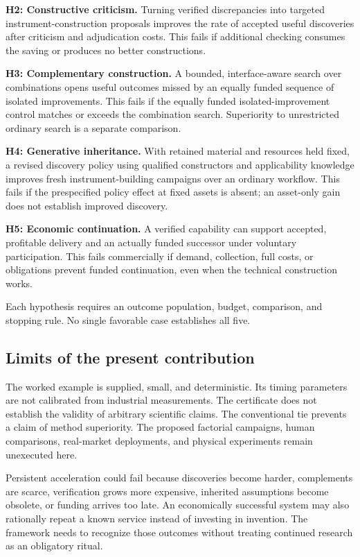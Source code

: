 \documentclass[11pt,letterpaper]{article}
\theoremstyle{remark}\newtheorem{remark}{Remark}[section]
\begin{document}
\textbf{H2: Constructive criticism.}
Turning verified discrepancies into targeted instrument-construction proposals improves the rate of accepted useful discoveries after criticism and adjudication costs.
This fails if additional checking consumes the saving or produces no better constructions.

\textbf{H3: Complementary construction.}
A bounded, interface-aware search over combinations opens useful outcomes missed by an equally funded sequence of isolated improvements.
This fails if the equally funded isolated-improvement control matches or exceeds the combination search.
Superiority to unrestricted ordinary search is a separate comparison.

\textbf{H4: Generative inheritance.}
With retained material and resources held fixed, a revised discovery policy using qualified constructors and applicability knowledge improves fresh instrument-building campaigns over an ordinary workflow.
This fails if the prespecified policy effect at fixed assets is absent; an asset-only gain does not establish improved discovery.

\textbf{H5: Economic continuation.}
A verified capability can support accepted, profitable delivery and an actually funded successor under voluntary participation.
This fails commercially if demand, collection, full costs, or obligations prevent funded continuation, even when the technical construction works.

Each hypothesis requires an outcome population, budget, comparison, and stopping rule.
No single favorable case establishes all five.

\subsection{Limits of the present contribution}
The worked example is supplied, small, and deterministic.
Its timing parameters are not calibrated from industrial measurements.
The certificate does not establish the validity of arbitrary scientific claims.
The conventional tie prevents a claim of method superiority.
The proposed factorial campaigns, human comparisons, real-market deployments, and physical experiments remain unexecuted here.

Persistent acceleration could fail because discoveries become harder, complements are scarce, verification grows more expensive, inherited assumptions become obsolete, or funding arrives too late.
An economically successful system may also rationally repeat a known service instead of investing in invention.
The framework needs to recognize those outcomes without treating continued research as an obligatory ritual.
\end{document}
